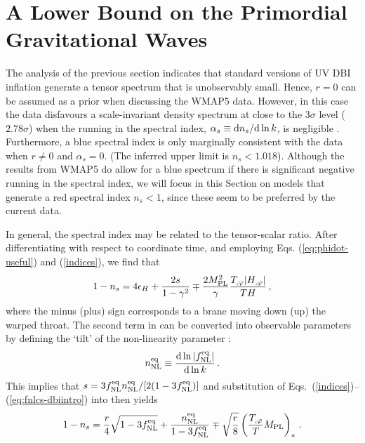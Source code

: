 \section{A Lower Bound on the Primordial Gravitational Waves} 
% 
\label{sec:lower-dbi}

The analysis of the previous section 
indicates that standard versions of UV DBI inflation generate a 
tensor spectrum that is unobservably 
small. Hence, $r=0$ can be assumed as a prior when discussing the WMAP5 data.
However, in this case the data 
disfavours a scale-invariant density spectrum at close to the $3 \sigma$ level
($2.78\sigma$)
when the running in the spectral index, $\alpha_s \equiv \mathrm{d} n_s/\mathrm{d}\ln k$, 
is negligible \cite{Komatsu:2008hk}.  
Furthermore, a blue spectral index 
is only marginally consistent with the data when $r\ne 0$ and $\alpha_s=0$. 
(The inferred upper limit is $n_s < 1.018$).
Although the results from WMAP5 do allow for a blue spectrum if there is 
significant negative running in the spectral index, we will 
focus in this Section 
on models that generate a red spectral index $n_s<1$, since these seem 
to be preferred by the current data.   


In general, the spectral index may be related to the tensor-scalar ratio. 
After differentiating  
with respect to coordinate time, and employing Eqs. (\ref{eq:phidot-useful}) 
and (\ref{indices}), we find that\footnotemark
% 
\begin{equation}
\label{eq:nsconstraint}
1-n_s = 4 \epsilon_H +\frac{2s}{1-\gamma^2} \mp 
\frac{2M_{\mathrm{PL}}^2}{\gamma} \frac{T_{,\varphi}|H_{,\varphi}|}{TH}  \,,
\end{equation}
% 
where the minus (plus) sign corresponds to 
a brane moving down (up) the warped throat.
%  
% 
The second term in 
can be converted into observable parameters
by defining the `tilt' of the non-linearity parameter  \cite{brane14}: 
% 
\begin{equation}
\label{eq:nnl-defn-dbi}
n_{\mathrm{NL}}^{\mathrm{eq}} \equiv \frac{\mathrm{d} \ln |f_{\mathrm{NL}}^{\mathrm{eq}}|}{\mathrm{d}\ln k}\,. 
\end{equation}
% 
This implies that $s=  3 f_{\mathrm{NL}}^{\mathrm{eq}} n_{\mathrm{NL}}^{\mathrm{eq}} /[2(1-3f_{\mathrm{NL}}^{\mathrm{eq}})]$ and     
substitution of Eqs.~(\ref{indices})--(\ref{eq:fnlcs-dbiintro}) 
into  then yields
% 
\begin{equation}
\label{eq:obscon1}
1-n_s = \frac{r}{4} \sqrt{1-3f_{\mathrm{NL}}^{\mathrm{eq}}} + \frac{n_{\mathrm{NL}}^{\mathrm{eq}}}{1-3f_{\mathrm{NL}}^{\mathrm{eq}}}
\mp \sqrt{\frac{r}{8}} \left( \frac{T_{,\varphi}}{T} M_{\mathrm{PL}} \right)_*  \,.
\end{equation}
% 


